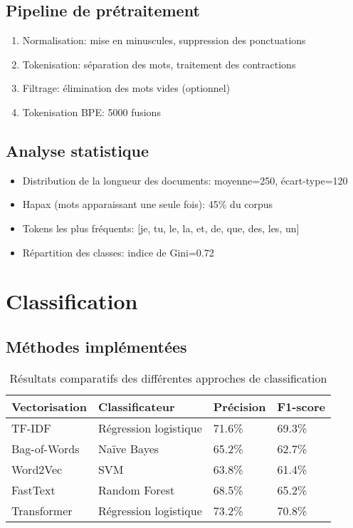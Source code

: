 \documentclass[a4paper,11pt]{article}
\begin{document}
\subsection{Pipeline de prétraitement}
\begin{enumerate}
    \item Normalisation: mise en minuscules, suppression des ponctuations
    \item Tokenisation: séparation des mots, traitement des contractions
    \item Filtrage: élimination des mots vides (optionnel)
    \item Tokenisation BPE: 5000 fusions
\end{enumerate}

\subsection{Analyse statistique}
\begin{itemize}
    \item Distribution de la longueur des documents: moyenne=250, écart-type=120
    \item Hapax (mots apparaissant une seule fois): 45\% du corpus
    \item Tokens les plus fréquents: [je, tu, le, la, et, de, que, des, les, un]
    \item Répartition des classes: indice de Gini=0.72
\end{itemize}

\section{Classification}
\label{sec:classification}

\subsection{Méthodes implémentées}
\begin{table}[h]
\centering
\begin{tabular}{llll}
\toprule
\textbf{Vectorisation} & \textbf{Classificateur} & \textbf{Précision} & \textbf{F1-score} \\
\midrule
TF-IDF & Régression logistique & 71.6\% & 69.3\% \\
Bag-of-Words & Naïve Bayes & 65.2\% & 62.7\% \\
Word2Vec & SVM & 63.8\% & 61.4\% \\
FastText & Random Forest & 68.5\% & 65.2\% \\
Transformer & Régression logistique & 73.2\% & 70.8\% \\
\bottomrule
\end{tabular}
\caption{Résultats comparatifs des différentes approches de classification}
\label{tab:classification-results}
\end{table}
\end{document}
